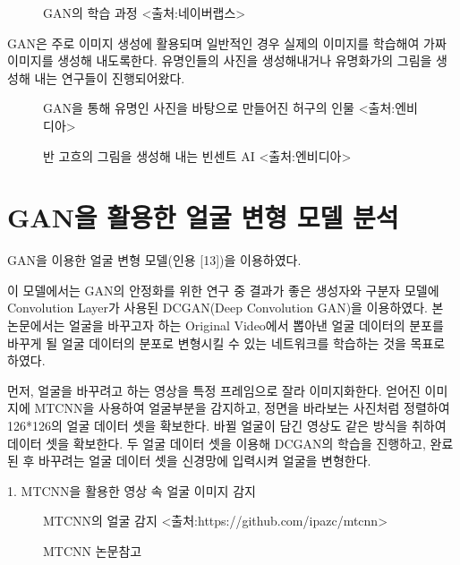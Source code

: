 \documentclass{oblivoir}
\begin{document}
\begin{figure}[h!]
    \centering
\caption{GAN의 학습 과정 <출처:네이버랩스>}
\end{figure}



GAN은 주로 이미지 생성에 활용되며 일반적인 경우 실제의 이미지를 학습해여 가짜 이미지를 생성해 내도록한다. 유명인들의 사진을 생성해내거나 유명화가의 그림을 생성해 내는 연구들이 진행되어왔다.

\begin{figure}[h!]
    \centering
\caption{GAN을 통해 유명인 사진을 바탕으로 만들어진 허구의 인물 <출처:엔비디아>}
\end{figure}


\begin{figure}[h!]
    \centering
\caption{반 고흐의 그림을 생성해 내는 빈센트 AI <출처:엔비디아>}
\end{figure}


\section{ GAN을 활용한 얼굴 변형 모델 분석}

GAN을 이용한 얼굴 변형 모델(인용 [13])을 이용하였다.

이 모델에서는 GAN의 안정화를 위한 연구 중 결과가 좋은 생성자와 구분자 모델에 Convolution Layer가 사용된 DCGAN(Deep Convolution GAN)을 이용하였다. 본 논문에서는 얼굴을 바꾸고자 하는 Original Video에서 뽑아낸 얼굴 데이터의 분포를 바꾸게 될 얼굴 데이터의 분포로 변형시킬 수 있는 네트워크를 학습하는 것을 목표로 하였다.

먼저, 얼굴을 바꾸려고 하는 영상을 특정 프레임으로 잘라 이미지화한다. 얻어진 이미지에 MTCNN을 사용하여 얼굴부분을 감지하고,  정면을 바라보는 사진처럼 정렬하여 126*126의 얼굴 데이터 셋을 확보한다. 바뀔 얼굴이 담긴 영상도 같은 방식을 취하여 데이터 셋을 확보한다. 두 얼굴 데이터 셋을 이용해 DCGAN의 학습을 진행하고, 완료된 후 바꾸려는 얼굴 데이터 셋을 신경망에 입력시켜 얼굴을 변형한다.

1. MTCNN을 활용한 영상 속 얼굴 이미지 감지


\begin{figure}[h!]
    \centering
\caption{MTCNN의 얼굴 감지 <출처:https://github.com/ipazc/mtcnn>}
\end{figure}

\begin{figure}[h!]
    \centering
\caption{MTCNN 논문참고}
\end{figure}
\end{document}
